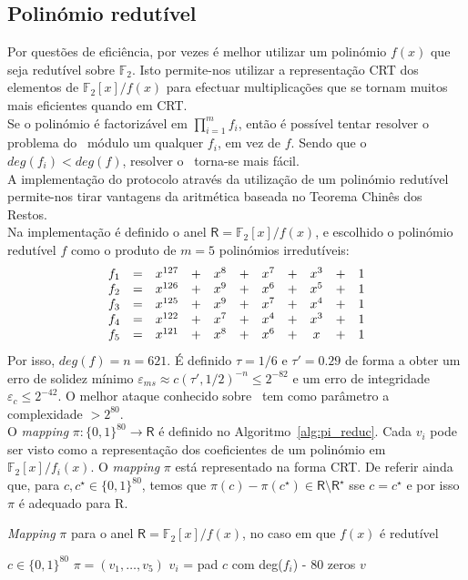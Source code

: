 \subsection{Polinómio redutível}
Por questões de eficiência, por vezes é melhor utilizar um polinómio $f(x)$ que seja redutível sobre $\mathbb{F}_2$. Isto permite-nos utilizar a representação CRT dos elementos de $\mathbb{F}_2[x]/f(x)$ para efectuar multiplicações que se tornam muitos mais eficientes quando em CRT.\\
Se o polinómio é factorizável em $\prod_{i=1}^{m} f_i$, então é possível tentar resolver o problema do \RingLPN\ módulo um qualquer $f_i$, em vez de $f$. Sendo que o $deg(f_i) < deg(f)$, resolver o \RingLPN\ torna-se mais fácil.\\
A implementação do protocolo através da utilização de um polinómio redutível permite-nos tirar vantagens da aritmética baseada no Teorema Chinês dos Restos.\\
Na implementação é definido o anel $\mathsf{R} = \mathbb{F}_2[x]/f(x)$, e escolhido o polinómio redutível $f$ como o produto de $m = 5$ polinómios irredutíveis:
$$
\begin{array}{c c c c c c c c c c c}
  f_1 &=& x^{127} &+& x^{8} &+& x^{7} &+& x^{3} &+& 1 \\
  f_2 &=& x^{126} &+& x^{9} &+& x^{6} &+& x^{5} &+& 1 \\
  f_3 &=& x^{125} &+& x^{9} &+& x^{7} &+& x^{4} &+& 1 \\
  f_4 &=& x^{122} &+& x^{7} &+& x^{4} &+& x^{3} &+& 1 \\
  f_5 &=& x^{121} &+& x^{8} &+& x^{6} &+& x     &+& 1 \\
\end{array}
$$
Por isso, $deg(f) = n = 621$. É definido $\tau = 1/6$ e $\tau' = 0.29$ de forma a obter um erro de solidez mínimo $\varepsilon_{ms} \approx c(\tau', 1/2)^{-n} \le 2^{-82}$ e um erro de integridade $\varepsilon_{c} \le 2^{-42}$. O melhor ataque conhecido sobre \RingLPNRtau\ tem como parâmetro a complexidade $>2^{80}$.\\
O \textit{mapping} $\pi : \{0,1\}^{80} \rightarrow \mathsf{R}$ é definido no Algoritmo~\ref{alg:pi_reduc}. Cada $v_i$ pode ser visto como a representação dos coeficientes de um polinómio em $\mathbb{F}_2[x]/f_i(x)$. O \textit{mapping} $\pi$ está representado na forma CRT. De referir ainda que, para $c, c^\star \in \{0,1\}^{80}$, temos que $\pi(c) - \pi(c^\star) \in \mathsf{R} \setminus \mathsf{R}^\star$ sse $c = c^\star$ e por isso $\pi$ é adequado para \textsf{R}.\\
\begin{algorithm}
  \caption{\textit{Mapping} $\pi$ para o anel $\mathsf{R} = \mathbb{F}_2[x]/f(x)$, no caso em que $f(x)$ é redutível}\label{alg:pi_reduc}
\begin{algorithmic}[htb!]
  \Require $c \in \{0, 1\}^{80}$
  \Ensure $\pi = (v_1, \dotsc, v_5)$
    \State    $v_i$ = pad $c$ com deg($f_i$) - 80 zeros
  \EndFor 
  \State \Return $v$
  \end{algorithmic}
\end{algorithm}

